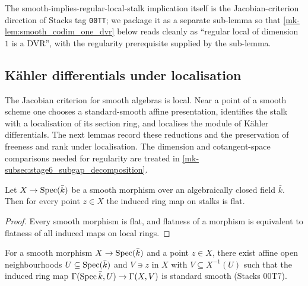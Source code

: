 The smooth-implies-regular-local-stalk implication itself is the Jacobian-criterion
direction of Stacks tag \texttt{00TT}; we package it as a separate sub-lemma so that
\ref{mk-lem:smooth_codim_one_dvr} below reads cleanly as ``regular local of dimension
\(1\) is a DVR'', with the regularity prerequisite supplied by the sub-lemma.

\subsection{K\"ahler differentials under localisation}
\label{mk-subsec:kaehler_localisation_substrate}

The Jacobian criterion for smooth algebras is local.  Near a point of a smooth
scheme one chooses a standard-smooth affine presentation, identifies the stalk
with a localisation of its section ring, and localises the module of K\"ahler
differentials.  The next lemmas record these reductions and the preservation of
freeness and rank under localisation.  The dimension and cotangent-space
comparisons needed for regularity are treated in
\ref{mk-subsec:stage6_subgap_decomposition}.

\begin{lemma}\label{mk-lem:stalkMap_flat_of_smooth}
  \leanok

  Let \(X \to \operatorname{Spec}(\bar k)\) be a smooth morphism over an algebraically closed
  field \(\bar k\). Then for every point \(z \in X\) the induced ring map on
  stalks is flat.
\end{lemma}

\begin{proof}
  Every smooth morphism is flat, and flatness of a morphism is equivalent to
  flatness of all induced maps on local rings.
\end{proof}

\begin{lemma}\label{mk-lem:exists_standardSmooth_at_of_smooth}
  \leanok

  For a smooth morphism \(X \to \operatorname{Spec}(\bar k)\) and a point \(z \in X\), there
  exist affine open neighbourhoods \(U \subseteq \operatorname{Spec}(\bar k)\) and \(V \ni z\)
  in \(X\) with \(V \subseteq X^{-1}(U)\) such that the induced ring map
  \(\Gamma(\operatorname{Spec} \bar k, U) \to \Gamma(X, V)\) is standard smooth (Stacks 00T7).
\end{lemma}

